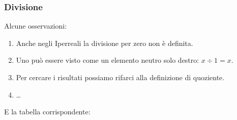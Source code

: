 \subsubsection{Divisione}
\label{subsec:insnum_divisione}


\noindent \begin{minipage}{.5\textwidth}
Alcune osservazioni:
\begin{enumerate} [noitemsep]
 \item Anche negli Iperreali la divisione per zero non è definita.
 \item Uno può essere visto come un elemento neutro solo destro: $x \div 1=x$.
 \item Per cercare i risultati possiamo rifarci alla definizione di quoziente.
 \item \dots
\end{enumerate}
\vspace{20mm}
\end{minipage}
\hfill
\begin{minipage}{.45\textwidth}
E la tabella corrispondente:
\begin{center}
\renewcommand{\arraystretch}{.0}
\end{center}
\end{minipage}

